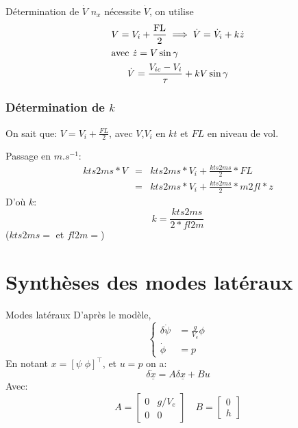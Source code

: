 \documentclass[footheight=2em]{beamer}
\begin{document}
\begin{frame}{D\'etermination de \(\dot{V}\)} \pause{}
    \(n_x\) n\'ecessite \(\dot{V}\), on utilise
    \begin{gather*}
        V = V_i + \frac{\text{FL}}{2} \implies \dot{V} = \dot{V}_i + k\dot{z}\\
        \intertext{avec \(\dot{z} = V\sin\gamma \)}
        \dot{V} = \frac{V_{ic} - V_i}{\tau} + kV\sin\gamma
    \end{gather*}
\end{frame}

\begin{frame}
    \frametitle{Détermination de \( k \)} \pause{}
    On sait que:
    \(
    V = V_i + \frac{FL}{2}
    \), avec \( V \),\( V_i \) en \( kt \) et \( FL \) en niveau de vol.

    Passage en \( m.s^{-1} \):
    \[
    \begin{array}{rcl}
        kts2ms * V &=& kts2ms * V_i + \frac{kts2ms}{2} * FL\\
        &=& kts2ms * V_i + \frac{kts2ms}{2} * m2fl * z
    \end{array}
    \] \pause{}
    D'où \( k \):
    \[
    \boxed{
        k = \frac{kts2ms}{2*fl2m}
    }
    \]
    (\( kts2ms = \) et \( fl2m = \))

\end{frame}

\section{Synth\`eses des modes lat\'eraux}
\begin{frame}{Modes lat\'eraux}
    D'apr\`es le mod\`ele,
    \[
        \left\lbrace
        \begin{aligned}
            \delta \dot{\psi} &= \frac{g}{V_e}\phi \\
            \dot{\phi} &= p
        \end{aligned}
        \right.
    \] \pause{}
    En notant \(x = {[\psi \; \phi]}^\top \), et \( u = p \) on a:
    \[
    \delta \underline{\dot{x}} = A \delta \underline{x} + B u
    \] \pause{}
    Avec:
    \[
    A = \begin{bmatrix}
           0 & g/V_e\\
           0 & 0
       \end{bmatrix}
       \quad
       B = \begin{bmatrix}
           0 \\ h
       \end{bmatrix}
   \]
\end{frame}
\end{document}
